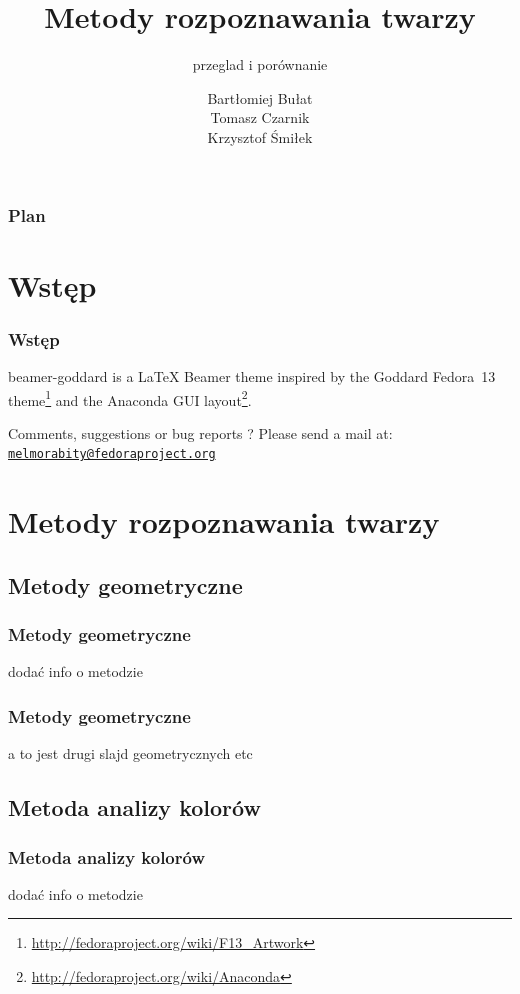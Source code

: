 \documentclass[xcolor=table]{beamer}
\title{Metody rozpoznawania twarzy}
\subtitle{przeglad i porównanie}
\author{Bartłomiej Bułat\\
Tomasz Czarnik\\
Krzysztof Śmiłek\\}
\newcommand{\email}[1]{\href{mailto:#1}{\texttt{#1}}}
\begin{document}
\begin{frame}
  \titlepage
\end{frame}


\begin{frame}
  \frametitle{Plan}
  \tableofcontents
\end{frame}


\section{Wstęp}

\begin{frame}
  \frametitle{Wstęp}

  beamer-goddard is a \LaTeX{} Beamer theme inspired by the Goddard Fedora~13 theme\footnote{\url{http://fedoraproject.org/wiki/F13_Artwork}} and the Anaconda GUI layout\footnote{\url{http://fedoraproject.org/wiki/Anaconda}}.

  \begin{block}{Comments, suggestions or bug reports ?}
    Please send a mail at: \email{melmorabity@fedoraproject.org}
  \end{block}
\end{frame}


\section{Metody rozpoznawania twarzy}

\subsection{Metody geometryczne}
\begin{frame}
  \frametitle{Metody geometryczne}

  dodać info o metodzie

\end{frame}

\begin{frame}
  \frametitle{Metody geometryczne}

  a to jest drugi slajd geometrycznych etc

\end{frame}

\subsection{Metoda analizy kolorów}
\begin{frame}
  \frametitle{Metoda analizy kolorów}

  dodać info o metodzie

\end{frame}
\end{document}
